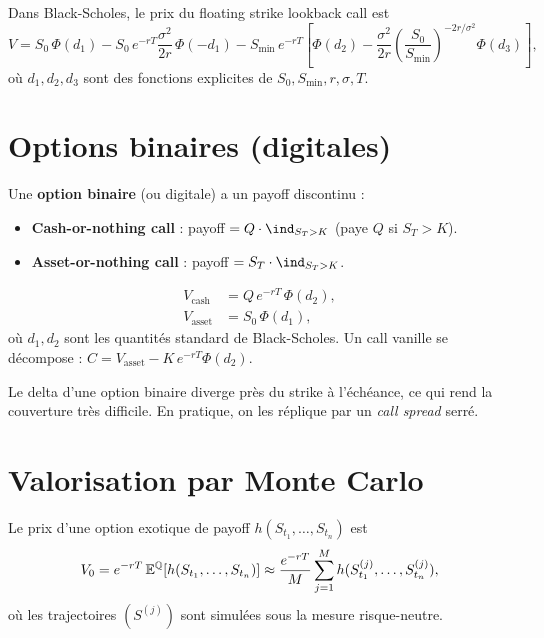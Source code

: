 \begin{theoreme}
Dans Black-Scholes, le prix du floating strike lookback call est
\[
    V = S_0\,\Phi(d_1) - S_0\,e^{-rT}\frac{\sigma^2}{2r}\,\Phi(-d_1)
    - S_{\min}\,e^{-rT}\left[\Phi(d_2) - \frac{\sigma^2}{2r}\left(\frac{S_0}{S_{\min}}\right)^{-2r/\sigma^2}\Phi(d_3)\right],
\]
o\`u $d_1, d_2, d_3$ sont des fonctions explicites de $S_0, S_{\min}, r, \sigma, T$.
\end{theoreme}

\section{Options binaires (digitales)}

\begin{definition}
Une \textbf{option binaire} (ou digitale) a un payoff discontinu :
\begin{itemize}
    \item \textbf{Cash-or-nothing call} : payoff $= Q \cdot \ind_{S_T > K}$
    (paye $Q$ si $S_T > K$).
    \item \textbf{Asset-or-nothing call} : payoff $= S_T \cdot \ind_{S_T > K}$.
\end{itemize}
\end{definition}

\begin{proposition}
\begin{align*}
    V_{\mathrm{cash}} &= Q\,e^{-rT}\,\Phi(d_2), \\
    V_{\mathrm{asset}} &= S_0\,\Phi(d_1),
\end{align*}
o\`u $d_1, d_2$ sont les quantit\'es standard de Black-Scholes.
Un call vanille se d\'ecompose : $C = V_{\mathrm{asset}} - K\,e^{-rT}\Phi(d_2)$.
\end{proposition}

\begin{remarque}
Le delta d'une option binaire diverge pr\`es du strike \`a l'\'ech\'eance,
ce qui rend la couverture tr\`es difficile. En pratique, on les r\'eplique par
un \textit{call spread} serr\'e.
\end{remarque}

\section{Valorisation par Monte Carlo}

\begin{definition}
Le prix d'une option exotique de payoff $h(S_{t_1}, \ldots, S_{t_n})$ est
\[
    V_0 = e^{-rT}\,\mathbb{E}^{\mathbb{Q}}[h(S_{t_1}, \ldots, S_{t_n})]
    \approx \frac{e^{-rT}}{M}\sum_{j=1}^{M} h(S_{t_1}^{(j)}, \ldots, S_{t_n}^{(j)}),
\]
o\`u les trajectoires $(S^{(j)})$ sont simul\'ees sous la mesure risque-neutre.
\end{definition}

